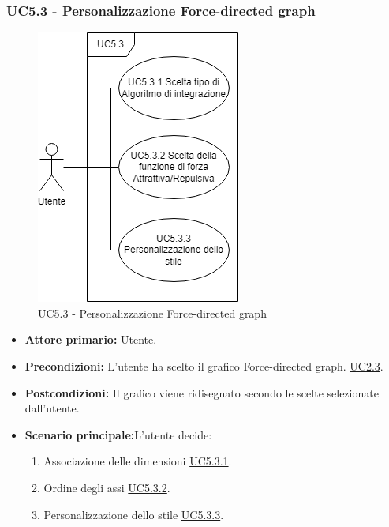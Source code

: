 \subsubsection{UC5.3 - Personalizzazione Force-directed graph}
\label{sec:UC5.3}
\begin{figure}[h!]
	\centering
	\includegraphics[scale=0.55]{../../assets/personalizzazioneForce-directedGraph.drawio.png}
	\caption{UC5.3 - Personalizzazione Force-directed graph}
\end{figure}
\begin{itemize}
    \item \textbf{Attore primario:} Utente.
	\item \textbf{Precondizioni:} L'utente ha scelto il grafico Force-directed graph. \hyperref[sec:UC2.3]{UC2.3}.
	\item \textbf{Postcondizioni:} Il grafico viene ridisegnato secondo le scelte selezionate dall'utente.
	\item \textbf{Scenario principale:}L'utente decide:
	\begin{enumerate}
        \item Associazione delle dimensioni \hyperref[sec:UC5.3.1]{UC5.3.1}.
        \item Ordine degli assi \hyperref[sec:UC5.3.2]{UC5.3.2}.
        \item Personalizzazione dello stile \hyperref[sec:UC5.3.3]{UC5.3.3}.
    \end{enumerate}
\end{itemize}
